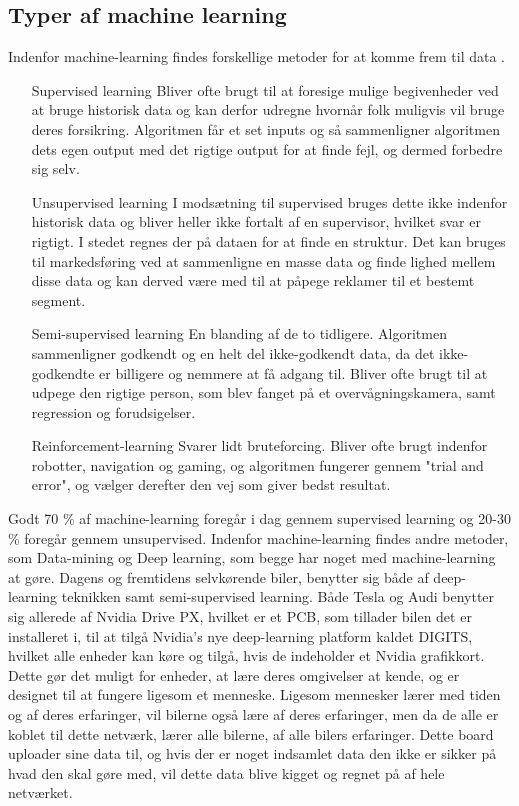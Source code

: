 \subsection{Typer af machine learning}
Indenfor machine-learning findes forskellige metoder for at komme frem til data \cite{MachineLearning}. 
	\begin{enumerate}
		\item[Supervised learning] Bliver ofte brugt til at foresige mulige begivenheder ved at bruge historisk data og kan derfor udregne hvornår folk muligvis vil bruge deres forsikring. Algoritmen får et set inputs og så sammenligner algoritmen dets egen output med det rigtige output for at finde fejl, og dermed forbedre sig selv.
		\item[Unsupervised learning] I modsætning til supervised bruges dette ikke indenfor historisk data og bliver heller ikke fortalt af en supervisor, hvilket svar er rigtigt. I stedet regnes der på dataen for at finde en struktur. Det kan bruges til markedsføring ved at sammenligne en masse data og finde lighed mellem disse data og kan derved være med til at påpege reklamer til et bestemt segment.
		\item[Semi-supervised learning] En blanding af de to tidligere. Algoritmen sammenligner godkendt og en helt del ikke-godkendt data, da det ikke-godkendte er billigere og nemmere at få adgang til. Bliver ofte brugt til at udpege den rigtige person, som blev fanget på et overvågningskamera, samt regression og forudsigelser.
		\item[Reinforcement-learning] Svarer lidt bruteforcing. Bliver ofte brugt indenfor robotter, navigation og gaming, og algoritmen fungerer gennem "trial and error", og vælger derefter den vej som giver bedst resultat.
	\end{enumerate}
Godt 70 \% af machine-learning foregår i dag gennem supervised learning og 20-30 \% foregår gennem unsupervised. Indenfor machine-learning findes andre metoder, som Data-mining og Deep learning, som begge har noget med machine-learning at gøre. Dagens og fremtidens selvkørende biler, benytter sig både af deep-learning teknikken samt semi-supervised learning\cite{Musk}. Både Tesla og Audi benytter sig allerede af Nvidia Drive PX, hvilket er et PCB, som tillader bilen det er installeret i, til at tilgå Nvidia's nye deep-learning platform kaldet DIGITS, hvilket alle enheder kan køre og tilgå, hvis de indeholder et Nvidia grafikkort. Dette gør det muligt for enheder, at lære deres omgivelser at kende, og er designet til at fungere ligesom et menneske. Ligesom mennesker lærer med tiden og af deres erfaringer, vil bilerne også lære af deres erfaringer, men da de alle er koblet til dette netværk, lærer alle bilerne, af alle bilers erfaringer\cite{Nvidia}. Dette board uploader sine data til, og hvis der er noget indsamlet data den ikke er sikker på hvad den skal gøre med, vil dette data blive kigget og regnet på af hele netværket.